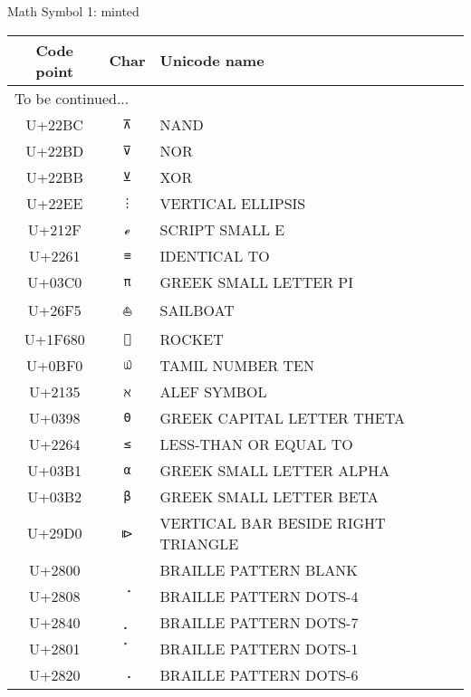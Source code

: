 \documentclass[a4paper]{article}
\begin{document}
{\Large Math Symbol 1: minted}

\begin{longtable}{ccl}
  \toprule
  Code point & Char & Unicode name \\
  \hline \endhead
  \multicolumn{3}{l}{To be continued...} \\ 
  \midrule \endfoot
  \bottomrule \endlastfoot

  U+22BC & \texttt{⊼}  & NAND \\ \hline
  U+22BD & \texttt{⊽}  & NOR \\ \hline
  U+22BB & \texttt{⊻}  & XOR \\ \hline
  U+22EE & \texttt{⋮}  & VERTICAL ELLIPSIS \\ \hline
  U+212F & \texttt{ℯ}  & SCRIPT SMALL E \\ \hline
  U+2261 & \texttt{≡}  & IDENTICAL TO \\ \hline
  U+03C0 & \texttt{π}  & GREEK SMALL LETTER PI \\ \hline
  U+26F5 & \texttt{⛵}  & SAILBOAT \\ \hline
  U+1F680 & \texttt{🚀}  & ROCKET \\ \hline
  U+0BF0 & \texttt{௰}  & TAMIL NUMBER TEN \\ \hline
  U+2135 & \texttt{ℵ}  & ALEF SYMBOL \\ \hline
  U+0398 & \texttt{Θ}  & GREEK CAPITAL LETTER THETA \\ \hline
  U+2264 & \texttt{≤}  & LESS-THAN OR EQUAL TO \\ \hline
  U+03B1 & \texttt{α}  & GREEK SMALL LETTER ALPHA \\ \hline
  U+03B2 & \texttt{β}  & GREEK SMALL LETTER BETA \\ \hline
  U+29D0 & \texttt{⧐}  & VERTICAL BAR BESIDE RIGHT TRIANGLE \\ \hline
  U+2800 & \texttt{⠀}  & BRAILLE PATTERN BLANK \\ \hline
  U+2808 & \texttt{⠈}  & BRAILLE PATTERN DOTS-4 \\ \hline
  U+2840 & \texttt{⡀}  & BRAILLE PATTERN DOTS-7 \\ \hline
  U+2801 & \texttt{⠁}  & BRAILLE PATTERN DOTS-1 \\ \hline
  U+2820 & \texttt{⠠}  & BRAILLE PATTERN DOTS-6 \\ \hline

  \bottomrule
\end{longtable}
\end{document}
